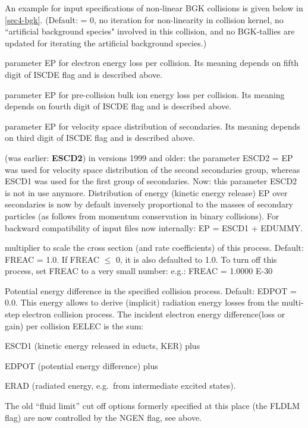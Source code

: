 \begin{description}
        An example for input specifications of non-linear \ac{BGK} collisions is given
        below in \cref{sec4-bgk}.
        (Default: = 0, no iteration for non-linearity in collision kernel, no
        ``artificial background species" involved in this collision, and no
        \acs{BGK}-tallies are updated for iterating the artificial background species.)
  \item[EELEC] parameter EP for electron energy loss per collision.
        Its meaning depends on fifth digit of ISCDE flag and is described above.
  \item[EBULK] parameter EP for pre-collision bulk ion energy loss per collision.
        Its meaning depends on fourth digit of ISCDE flag and is described above.
  \item[ESCD1] parameter EP for velocity space distribution of secondaries.
        Its meaning depends on third digit of ISCDE flag and is described above.
  \item[EDUMMY] (was earlier: \textbf{ESCD2}) in versions 1999 and older: the
        parameter ESCD2 = EP was used for velocity space distribution of the second
        secondaries group, whereas ESCD1 was used for the first group of secondaries.
        Now: this parameter ESCD2 is not in use anymore.
        Distribution of energy (kinetic energy release) EP over secondaries is now by
        default inversely proportional to the masses of secondary particles (as follows
        from momentum conservation in binary collisions).
        For backward compatibility of input files now internally: EP = ESCD1 + EDUMMY.
  \item[FREAC] multiplier to scale the cross section (and rate coefficients) of
        this process.
        Default: FREAC = 1.0.
        If FREAC $\leq$ 0, it is also defaulted to 1.0.
        To turn off this process, set FREAC to a very small number: e.g.: FREAC =
        1.0000 E-30
  \item[EDPOT] Potential energy difference in the specified collision
        process.
        Default: EDPOT = 0.0.
        This energy allows to derive (implicit) radiation energy losses from the
        multi-step electron collision process.
        The incident electron energy difference(loss or gain) per collision EELEC is
        the sum:

        ESCD1 (kinetic energy released in educts, KER) plus 

        EDPOT (potential energy difference) plus 

        ERAD (radiated energy, e.g.\ from intermediate excited states).

        The old ``fluid limit'' cut off options formerly specified at this place (the
        FLDLM flag) are now controlled by the NGEN flag, see above.

\end{description}

